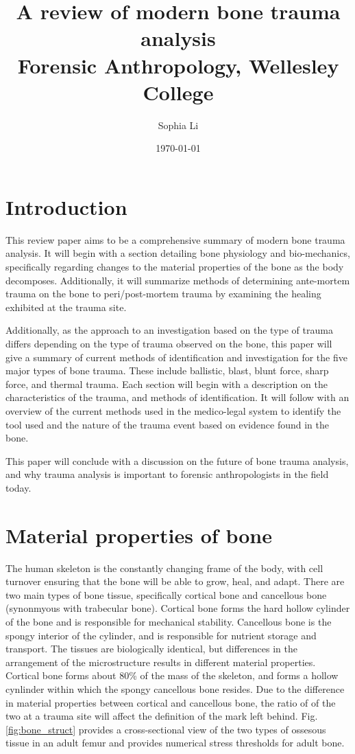 \documentclass[titlepage]{article}
\title{A review of modern bone trauma analysis\\ \large Forensic Anthropology, Wellesley College}
\author{Sophia Li}
\date{\today \\ \vspace{5em}}
\begin{document}
\maketitle


\section{Introduction}
This review paper aims to be a comprehensive summary of modern bone trauma analysis. It will begin with a section detailing bone physiology and bio-mechanics, specifically regarding changes to the material properties of the bone as the body decomposes. Additionally, it will summarize methods of determining ante-mortem trauma on the bone to peri/post-mortem trauma by examining the healing exhibited at the trauma site.

Additionally, as the approach to an investigation based on the type of trauma differs depending on the type of trauma observed on the bone, this paper will give a summary of current methods of identification and investigation for the five major types of bone trauma. These include ballistic, blast, blunt force, sharp force, and thermal trauma. Each section will begin with a description on the characteristics of the trauma, and methods of identification. It will follow with an overview of the current methods used in the medico-legal system to identify the tool used and the nature of the trauma event based on evidence found in the bone.

This paper will conclude with a discussion on the future of bone trauma analysis, and why trauma analysis is important to forensic anthropologists in the field today.

\section{Material properties of bone}
The human skeleton is the constantly changing frame of the body, with cell turnover ensuring that the bone will be able to grow, heal, and adapt. There are two main types of bone tissue, specifically cortical bone and cancellous bone (synonmyous with trabecular bone). Cortical bone forms the hard hollow cylinder of the bone and is responsible for mechanical stability. Cancellous bone is the spongy interior of the cylinder, and is responsible for nutrient storage and transport. The tissues are biologically identical, but differences in the arrangement of the microstructure results in different material properties. Cortical bone forms about 80\% of the mass of the skeleton, and forms a hollow cynlinder within which the spongy cancellous bone resides. \cite{bone} Due to the difference in material properties between cortical and cancellous bone, the ratio of of the two at a trauma site will affect the definition of the mark left behind. Fig.\ref{fig:bone_struct} provides a cross-sectional view of the two types of ossesous tissue in an adult femur and provides numerical stress thresholds for adult bone.
\end{document}
